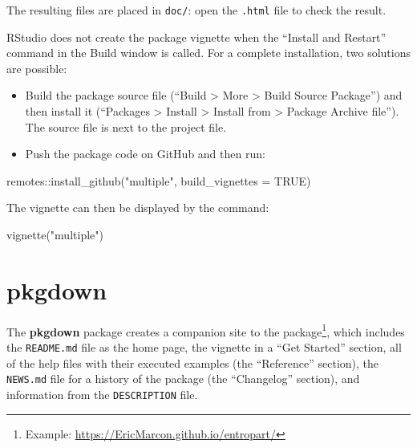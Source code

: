\documentclass[
  12pt,
  american,
  a4paper,
  extrafontsizes,onecolumn,openright
  ]{memoir}
\newenvironment{Shaded}{\begin{snugshade}}{\end{snugshade}}
\newcommand{\AttributeTok}[1]{\textcolor[rgb]{0.77,0.63,0.00}{#1}}
\newcommand{\ConstantTok}[1]{\textcolor[rgb]{0.00,0.00,0.00}{#1}}
\newcommand{\FunctionTok}[1]{\textcolor[rgb]{0.00,0.00,0.00}{#1}}
\newcommand{\NormalTok}[1]{#1}
\newcommand{\SpecialCharTok}[1]{\textcolor[rgb]{0.00,0.00,0.00}{#1}}
\newcommand{\StringTok}[1]{\textcolor[rgb]{0.31,0.60,0.02}{#1}}
\providecommand{\tightlist}{%
  \setlength{\itemsep}{0pt}\setlength{\parskip}{0pt}}
\begin{document}
\normalsize

The resulting files are placed in \texttt{doc/}: open the \texttt{.html} file to check the result.

RStudio does not create the package vignette when the \enquote{Install and Restart} command in the Build window is called.
For a complete installation, two solutions are possible:

\begin{itemize}
\tightlist
\item
  Build the package source file (\enquote{Build \textgreater{} More \textgreater{} Build Source Package}) and then install it (\enquote{Packages \textgreater{} Install \textgreater{} Install from \textgreater{} Package Archive file}).
  The source file is next to the project file.
\item
  Push the package code on GitHub and then run:
\end{itemize}

\scriptsize

\begin{Shaded}
\begin{Highlighting}[]
\NormalTok{remotes}\SpecialCharTok{::}\FunctionTok{install\_github}\NormalTok{(}\StringTok{"multiple"}\NormalTok{, }\AttributeTok{build\_vignettes =} \ConstantTok{TRUE}\NormalTok{)}
\end{Highlighting}
\end{Shaded}

\normalsize

The vignette can then be displayed by the command:

\scriptsize

\begin{Shaded}
\begin{Highlighting}[]
\FunctionTok{vignette}\NormalTok{(}\StringTok{"multiple"}\NormalTok{)}
\end{Highlighting}
\end{Shaded}

\normalsize

\hypertarget{pkgdown}{%
\section{pkgdown}\label{pkgdown}}

The \textbf{pkgdown} package creates a companion site to the package\footnote{Example: \url{https://EricMarcon.github.io/entropart/}}, which includes the \texttt{README.md} file as the home page, the vignette in a \enquote{Get Started} section, all of the help files with their executed examples (the \enquote{Reference} section), the \texttt{NEWS.md} file for a history of the package (the \enquote{Changelog} section), and information from the \texttt{DESCRIPTION} file.
\end{document}
